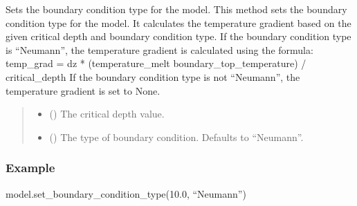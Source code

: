 \documentclass[a4paper,11pt,english,openany]{sphinxmanual}
\begin{document}
\begin{fulllineitems}
\begin{fulllineitems}
\label{\detokenize{api/spyice.models.sea_ice_model:spyice.models.sea_ice_model.SeaIceModel.set_boundary_condition_type}}
\pysigstartsignatures
{}
\pysigstopsignatures
\sphinxAtStartPar
Sets the boundary condition type for the model. This method sets the boundary condition type for the model. It calculates the temperature gradient based on the given critical depth and boundary condition type. If the boundary condition type is “Neumann”, the temperature gradient is calculated using the formula:
temp\_grad = dz * (temperature\_melt \sphinxhyphen{} boundary\_top\_temperature) / critical\_depth
If the boundary condition type is not “Neumann”, the temperature gradient is set to None.
\begin{quote}\begin{description}
\begin{itemize}
\item {} 
\sphinxAtStartPar
{} () \textendash{} The critical depth value.

\item {} 
\sphinxAtStartPar
{} (\sphinxstyleliteralemphasis{\sphinxupquote{, }}) \textendash{} The type of boundary condition. Defaults to “Neumann”.

\end{itemize}

\end{description}\end{quote}
\subsubsection*{Example}

\sphinxAtStartPar
model.set\_boundary\_condition\_type(10.0, “Neumann”)

\end{fulllineitems}



\end{fulllineitems}
\end{document}
